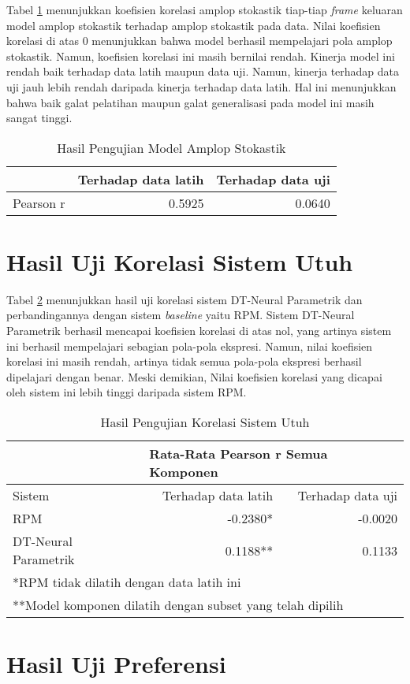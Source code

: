 Tabel \ref{tab-stoc-testing-results} menunjukkan koefisien korelasi amplop stokastik tiap-tiap \textit{frame} keluaran model amplop stokastik terhadap amplop stokastik pada data. Nilai koefisien korelasi di atas 0 menunjukkan bahwa model berhasil mempelajari pola amplop stokastik. Namun, koefisien korelasi ini masih bernilai rendah. Kinerja model ini rendah baik terhadap data latih maupun data uji. Namun, kinerja terhadap data uji jauh lebih rendah daripada kinerja terhadap data latih. Hal ini menunjukkan bahwa baik galat pelatihan maupun galat generalisasi pada model ini masih sangat tinggi.

\begin{table}[htbp]
    \centering
    \caption{Hasil Pengujian Model Amplop Stokastik}\label{tab-stoc-testing-results}
    \begin{tabular}{ |l|r|r| } 
     \cline{2-3}
     \multicolumn{1}{l|}{}&Terhadap data latih&Terhadap data uji\\\hline
	 Pearson r&0.5925  &0.0640\\\hline
    \end{tabular}
\end{table}


\section{Hasil Uji Korelasi Sistem Utuh}
Tabel \ref{tab-system-testing-results} menunjukkan hasil uji korelasi sistem DT-Neural Parametrik dan perbandingannya dengan sistem \textit{baseline} yaitu RPM. Sistem DT-Neural Parametrik berhasil mencapai koefisien korelasi di atas nol, yang artinya sistem ini berhasil mempelajari sebagian pola-pola ekspresi. Namun, nilai koefisien korelasi ini masih rendah, artinya tidak semua pola-pola ekspresi berhasil dipelajari dengan benar. Meski demikian, Nilai koefisien korelasi yang dicapai oleh sistem ini lebih tinggi daripada sistem RPM.

\begin{table}[htbp]
    \centering
    \caption{Hasil Pengujian Korelasi Sistem Utuh}\label{tab-system-testing-results}
    \begin{tabular}{ |l|r|r| } 
     \cline{2-3}
     \multicolumn{1}{l|}{}&\multicolumn{2}{|l|}{Rata-Rata Pearson r Semua Komponen}\\\hline
     Sistem&Terhadap data latih&Terhadap data uji\\\hline
	 RPM&-0.2380* &-0.0020\\\hline
	 DT-Neural Parametrik& 0.1188**&0.1133\\\hline
	 \multicolumn{3}{l}{*RPM tidak dilatih dengan data latih ini}\\
	 \multicolumn{3}{l}{**Model komponen dilatih dengan subset yang telah dipilih}\\
    \end{tabular}
\end{table}


\section{Hasil Uji Preferensi}
\blindtext